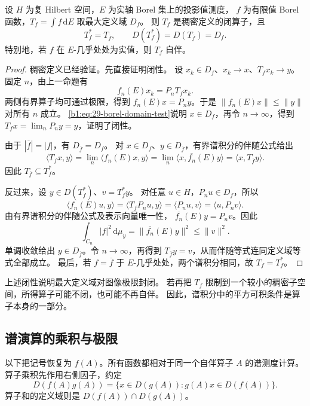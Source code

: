 \begin{theorem}[无界谱积分的闭性与伴随]
\label{b1:thm:29-unbounded-calculus-adjoint}
设 \(H\) 为复 Hilbert 空间，\(E\) 为实轴 Borel 集上的投影值测度，
\(f\) 为有限值 Borel 函数，\(T_f=\int f\,\mathrm dE\) 取最大定义域 \(D_f\)。
则 \(T_f\) 是稠密定义的闭算子，且
\begin{equation}\label{b1:eq:29-unbounded-calculus-adjoint}
 T_f^*=T_{\overline f},\qquad
 D(T_f^*)=D(T_{\overline f})=D_f.
\end{equation}
特别地，若 \(f\) 在 \(E\)-几乎处处为实值，则 \(T_f\) 自伴。
\end{theorem}
\begin{proof}
稠密定义已经验证。先直接证明闭性。
设 \(x_k\in D_f\)、\(x_k\to x\)、\(T_fx_k\to y\)。
固定 \(n\)，由上一命题有
\[
 f_n(E)x_k=P_nT_fx_k.
\]
两侧有界算子均可通过极限，得到 \(f_n(E)x=P_ny\)。于是
\(\|f_n(E)x\|\le\|y\|\) 对所有 \(n\) 成立。
\eqref{b1:eq:29-borel-domain-test}说明 \(x\in D_f\)，再令 \(n\to\infty\)，得到
\(T_fx=\lim_nP_ny=y\)，证明了闭性。

由于 \(|\overline f|=|f|\)，有 \(D_{\overline f}=D_f\)。
对 \(x\in D_f\)、\(y\in D_{\overline f}\)，有界谱积分的伴随公式给出
\[
 \langle T_fx,y\rangle
 =\lim_n\langle f_n(E)x,y\rangle
 =\lim_n\langle x,\overline{f_n}(E)y\rangle
 =\langle x,T_{\overline f}y\rangle.
\]
因此 \(T_{\overline f}\subseteq T_f^*\)。

反过来，设 \(y\in D(T_f^*)\)、\(v=T_f^*y\)。
对任意 \(u\in H\)，\(P_nu\in D_f\)，所以
\[
 \langle f_n(E)u,y\rangle
 =\langle T_fP_nu,y\rangle
 =\langle P_nu,v\rangle
 =\langle u,P_nv\rangle.
\]
由有界谱积分的伴随公式及表示向量唯一性，
\(\overline{f_n}(E)y=P_nv\)。因此
\[
 \int_{C_n}|f|^2\,\mathrm d\mu_y
 =\|\overline{f_n}(E)y\|^2\le\|v\|^2.
\]
单调收敛给出 \(y\in D_{\overline f}\)。令 \(n\to\infty\)，再得到
\(T_{\overline f}y=v\)，从而伴随等式连同定义域等式全部成立。
最后，若 \(f=\overline f\) 于 \(E\)-几乎处处，两个谱积分相同，故 \(T_f=T_f^*\)。
\end{proof}

上述闭性说明最大定义域对图像极限封闭。
若再把 \(T_f\) 限制到一个较小的稠密子空间，所得算子可能不闭，也可能不再自伴。
因此，谱积分中的平方可积条件是算子本身的一部分。

\subsection{谱演算的乘积与极限}
\label{b1:subsec:290604}

以下把记号恢复为 \(f(A)\)。所有函数都相对于同一个自伴算子 \(A\) 的谱测度计算。
算子乘积先作用右侧因子，约定
\[
 D(f(A)g(A))
 =\{x\in D(g(A)):g(A)x\in D(f(A))\}.
\]
算子和的定义域则是 \(D(f(A))\cap D(g(A))\)。

